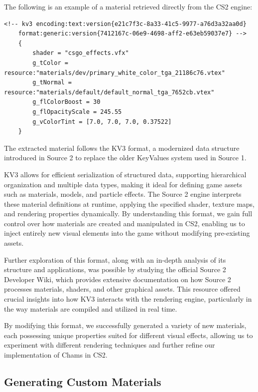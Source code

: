 The following is an example of a material retrieved directly from the CS2 engine:

\begin{lstlisting}[style=cppstyle, caption={Extracted Default Material from CS2}]
<!-- kv3 encoding:text:version{e21c7f3c-8a33-41c5-9977-a76d3a32aa0d}
    format:generic:version{7412167c-06e9-4698-aff2-e63eb59037e7} -->
    {
        shader = "csgo_effects.vfx"
        g_tColor = resource:"materials/dev/primary_white_color_tga_21186c76.vtex"
        g_tNormal = resource:"materials/default/default_normal_tga_7652cb.vtex"
        g_flColorBoost = 30
        g_flOpacityScale = 245.55
        g_vColorTint = [7.0, 7.0, 7.0, 0.37522]
    }
\end{lstlisting}

The extracted material follows the KV3 format, a modernized data structure introduced in Source 2 to replace the older KeyValues system used in Source 1. 

KV3 allows for efficient serialization of structured data, supporting hierarchical organization and multiple data types, making it ideal for defining game assets such as materials, models, and particle effects. The Source 2 engine interprets these material definitions at runtime, applying the specified shader, texture maps, and rendering properties dynamically. By understanding this format, we gain full control over how materials are created and manipulated in CS2, enabling us to inject entirely new visual elements into the game without modifying pre-existing assets.

Further exploration of this format, along with an in-depth analysis of its structure and applications, was possible by studying the official Source 2 Developer Wiki, which provides extensive documentation on how Source 2 processes materials, shaders, and other graphical assets. This resource offered crucial insights into how KV3 interacts with the rendering engine, particularly in the way materials are compiled and utilized in real time.

By modifying this format, we successfully generated a variety of new materials, each possessing unique properties suited for different visual effects, allowing us to experiment with different rendering techniques and further refine our implementation of Chams in CS2.

\subsection{Generating Custom Materials}

